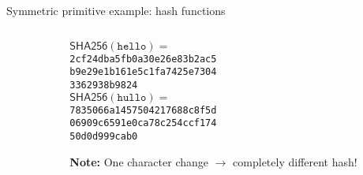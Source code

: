 \documentclass[aspectratio=169, lualatex, handout]{beamer}
\begin{document}
\begin{frame}{Symmetric primitive example: hash functions}
	\begin{columns}[c]
		\begin{column}{0.55\textwidth}
		\end{column}
		\begin{column}{0.45\textwidth}
			\begin{tcolorbox}
				[colback=black!5!white,colframe=ciphergray] $\mathsf{SHA256}(\texttt{hello}) =$ \\ {\small\texttt{2cf24dba5fb0a30e26e83b2ac5}\\ \texttt{b9e29e1b161e5c1fa7425e7304}\\
				\texttt{3362938b9824}}\\[1em]
				$\mathsf{SHA256}(\texttt{hullo}) =$ \\ {\small\texttt{7835066a1457504217688c8f5d}\\
				\texttt{06909c6591e0ca78c254ccf174}\\ \texttt{50d0d999cab0}}
			\end{tcolorbox}
			\textcolor{cipherprimary}{\textbf{Note:} \small One character change $\rightarrow$
				completely different hash!}
		\end{column}
	\end{columns}
\end{frame}
\end{document}
